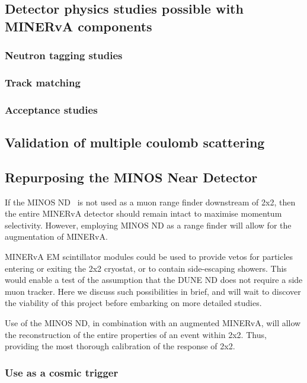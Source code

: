 \subsection{Detector physics studies possible with MINERvA components}

\subsubsection{Neutron tagging studies}

\subsubsection{Track matching}

\subsubsection{Acceptance studies}

\subsection{Validation of multiple coulomb scattering}

\subsection{Repurposing the MINOS Near Detector}


If the MINOS ND~\cite{MINOSDetectors} is not used as a muon range finder downstream of 2x2, then the entire MINERvA  detector should remain intact to maximise momentum selectivity.
However, employing MINOS ND as a range finder will allow for the augmentation of MINERvA.

MINERvA EM scintillator modules could be used to provide vetos for particles entering or exiting the 2x2 cryostat, or to contain side-escaping showers. 
This would enable a test of the assumption that the DUNE ND does not require a side muon tracker. 
Here we discuss such possibilities in brief, and will wait to discover the viability of this project before embarking on more detailed studies.

Use of the MINOS ND, in combination with an augmented MINERvA, will allow the reconstruction of the entire properties of an event within 2x2. 
Thus, providing the most thorough calibration of the response of 2x2.  
 
\subsubsection{Use as a cosmic trigger}
